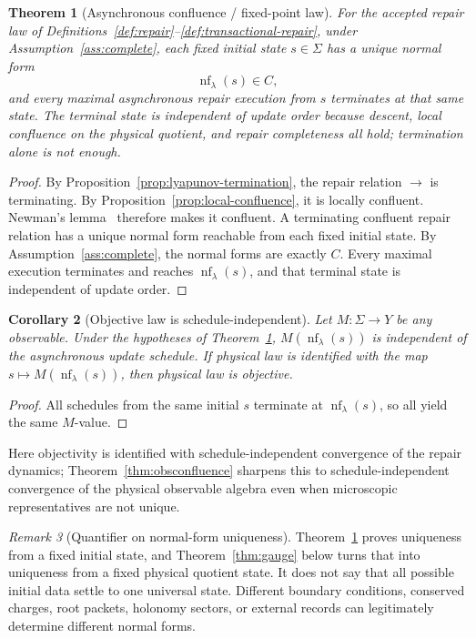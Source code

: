 \documentclass[11pt]{article}
\newtheorem{theorem}{Theorem}[section]
\newtheorem{corollary}[theorem]{Corollary}
\theoremstyle{remark}
\newtheorem{remark}[theorem]{Remark}
\theoremstyle{plain}
\begin{document}
\begin{theorem}[Asynchronous confluence / fixed-point law]\label{thm:confluence}
For the accepted repair law of Definitions~\ref{def:repair}--\ref{def:transactional-repair},
under Assumption~\ref{ass:complete}, each fixed initial state $s\in\Sigma$ has a unique normal form
\[
\operatorname{nf}_\lambda(s)\in C,
\]
and every maximal asynchronous repair execution from $s$ terminates at that same state. The terminal state is independent of update order because descent, local confluence on the physical quotient, and repair completeness all hold; termination alone is not enough.
\end{theorem}

\begin{proof}
By Proposition~\ref{prop:lyapunov-termination}, the repair relation \(\to\) is terminating.
By Proposition~\ref{prop:local-confluence}, it is locally confluent. Newman's
lemma~\cite{newman42} therefore makes it confluent. A terminating confluent repair relation has a
unique normal form reachable from each fixed initial state. By Assumption~\ref{ass:complete}, the
normal forms are exactly \(C\). Every maximal execution terminates and reaches
\(\operatorname{nf}_\lambda(s)\), and that terminal state is independent of update order.
\end{proof}

\begin{corollary}[Objective law is schedule-independent]\label{cor:objective}
Let $M:\Sigma\to Y$ be any observable. Under the hypotheses of Theorem~\ref{thm:confluence}, $M(\operatorname{nf}_\lambda(s))$ is independent of the asynchronous update schedule. If physical law is identified with the map $s\mapsto M(\operatorname{nf}_\lambda(s))$, then physical law is objective.
\end{corollary}

\begin{proof}
All schedules from the same initial $s$ terminate at $\operatorname{nf}_\lambda(s)$, so all yield the same $M$-value.
\end{proof}

Here objectivity is identified with schedule-independent convergence of the repair
dynamics; Theorem~\ref{thm:obsconfluence} sharpens this to schedule-independent convergence of the
physical observable algebra even when microscopic representatives are not unique.

\begin{remark}[Quantifier on normal-form uniqueness]\label{rem:normal-form-quantifier}
Theorem~\ref{thm:confluence} proves uniqueness from a fixed initial state, and
Theorem~\ref{thm:gauge} below turns that into uniqueness from a fixed physical quotient state. It
does not say that all possible initial data settle to one universal state. Different boundary
conditions, conserved charges, root packets, holonomy sectors, or external records can
legitimately determine different normal forms.
\end{remark}
\end{document}
